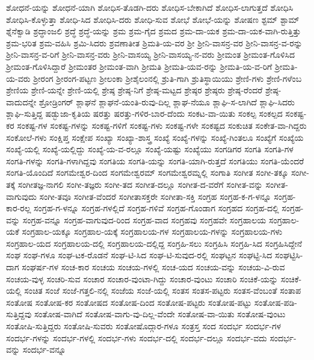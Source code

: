{ಶೋಧನೆ-ಯನ್ನು
ಶೋಧನೆ-ಯಾಗಿ
ಶೋಧಿಸ-ತೊಡಗಿ-ದರು
ಶೋಧಿಸ-ಬೇಕಾಗಿದೆ
ಶೋಧಿಸ-ಲಾಗುತ್ತದೆ
ಶೋಧಿಸಿ
ಶೋಧಿಸಿ-ಕೊಳ್ಳುತ್ತಾ
ಶೋಧಿ-ಸಿದ
ಶೋಧಿಸಿ-ದರು
ಶೋಧಿ-ಸುವ
ಶೋಭೆ
ಶೋಭೆ-ಯನ್ನು
ಶೋಷಣ
ಶ್ಟಮ್
ಶ್ಟಾಮ್
ಶ್ನೆನೆಕ್ವಾಡಿ
ಶ್ರದ್ಧಾಂಜಲಿ
ಶ್ರದ್ಧೆ
ಶ್ರದ್ಧೆ-ಯನ್ನು
ಶ್ರಮ
ಶ್ರಮ-ಗೈದ
ಶ್ರಮದ
ಶ್ರಮ-ದಾ-ಯಕ
ಶ್ರಮ-ದಾ-ಯಕ-ವಾಗಿ-ರುತ್ತಿತ್ತು
ಶ್ರಮ-ಭರಿತ
ಶ್ರಮ-ವಹಿಸಿ
ಶ್ರಮಿ-ಸಿದರು
ಶ್ರವಣಾತೀತ
ಶ್ರಿಮತಿ-ಯ-ವರ
ಶ್ರೀ
ಶ್ರೀನಿ-ವಾಸನ್ರ-ವರ
ಶ್ರೀನಿ-ವಾಸನ್ರ-ವ-ರನ್ನು
ಶ್ರೀನಿ-ವಾಸನ್ರ-ವ-ರಿಗೆ
ಶ್ರೀನಿ-ವಾಸನ್ರ-ವರು
ಶ್ರೀನಿ-ವಾಸಯ್ಯ
ಶ್ರೀನಿ-ವಾಸಯ್ಯ-ನ-ವರು
ಶ್ರೀಮಂತ
ಶ್ರೀಮಂತ-ಗೊಳಿಸಿದ
ಶ್ರೀಮಂತ-ಗೊಳಿಸಿದ್ದಾರೆ
ಶ್ರೀಮಂತರ
ಶ್ರೀಮಂತ-ವಾಗಿ
ಶ್ರೀಮತಿ
ಶ್ರೀಮತಿ-ಯವ-ರನ್ನು
ಶ್ರೀಮತಿ-ಯ-ವ-ರಿಗೆ
ಶ್ರೀಮತಿ-ಯ-ವರು
ಶ್ರೀರಂಗ
ಶ್ರೀರಂಗ-ಪಟ್ಟಣ
ಶ್ರೀಲಂಕಾ
ಶ್ರೀಶೈಲಂನಲ್ಲಿ
ಶ್ರುತಿ-ಗಾಗಿ
ಶ್ರುತಿಸ್ಥಾಯಿಯು
ಶ್ರೇಣಿ-ಗಳು
ಶ್ರೇಣಿ-ಗಳೆಂಬ
ಶ್ರೇಣಿಯ
ಶ್ರೇಣಿ-ಯನ್ನೇ
ಶ್ರೇಣಿ-ಯಲ್ಲಿ
ಶ್ರೇಷ್ಠ
ಶ್ರೇಷ್ಠ-ನಿಗೆ
ಶ್ರೇಷ್ಠ-ಮಟ್ಟದ
ಶ್ರೇಷ್ಠರ
ಶ್ರೇಷ್ಠರು
ಶ್ರೇಷ್ಠ-ರೆಂದರೆ
ಶ್ರೇಷ್ಠ-ವಾದುದನ್ನೇ
ಶ್ರೋಡ್ರಿಂಗರ್
ಶ್ಲಾಘನೆ
ಶ್ಲಾಘನೆ-ಯಂತಿ-ರುವು-ದಿಲ್ಲ
ಶ್ಲಾಘ-ನೆಯೂ
ಶ್ಲಾಘಿ-ಸ-ಲಾಗಿದೆ
ಶ್ಲಾಘಿ-ಸಿದರು
ಶ್ಲಾಘಿ-ಸುತ್ತಿದ್ದ
ಷಡ್ಭುಜಾ-ಕೃತಿಯ
ಷರತ್ತು
ಷರತ್ತು-ಗಳಿರ-ಬಾರ-ದೆಂದು
ಸಂಕಟ-ವಾ-ಯಿತು
ಸಂಕಲ್ಪ
ಸಂಕಲ್ಪದ
ಸಂಕಷ್ಟ-ಕರ
ಸಂಕಷ್ಟ-ಗಳ
ಸಂಕಷ್ಟ-ಗಳನ್ನು
ಸಂಕಷ್ಟ-ಗಳಿಗೆ
ಸಂಕಷ್ಟ-ಗಳು
ಸಂಕಷ್ಟ-ಗಳೇ
ಸಂಕಷ್ಟದ
ಸಂಕುಚಿತ
ಸಂಕೇತ-ವಾ-ಗಿದ್ದರು
ಸಂಕೋಲೆ-ಗಳು
ಸಂಕ್ಷಿಪ್ತ
ಸಂಕ್ಷೇಪ
ಸಂಖ್ಯಾ
ಸಂಖ್ಯಾ-ಶಾಸ್ತ್ರ
ಸಂಖ್ಯೆ
ಸಂಖ್ಯೆ-ಗಳನ್ನು
ಸಂಖ್ಯೆ-ಗಿಂತಲೂ
ಸಂಖ್ಯೆಗೆ
ಸಂಖ್ಯೆಯ
ಸಂಖ್ಯೆ-ಯಲ್ಲಿ
ಸಂಖ್ಯೆ-ಯಲ್ಲಿದ್ದು
ಸಂಖ್ಯೆ-ಯ-ವ-ರಲ್ಲೂ
ಸಂಖ್ಯೆ-ಯಷ್ಟು
ಸಂಖ್ಯೆಯು
ಸಂಗಡಿಗರ
ಸಂಗತಿ
ಸಂಗತಿ-ಗಳ
ಸಂಗತಿ-ಗಳನ್ನು
ಸಂಗತಿ-ಗಳಾಗಿದ್ದವು
ಸಂಗತಿಯ
ಸಂಗತಿ-ಯನ್ನು
ಸಂಗತಿ-ಯಾಗಿ-ರುತ್ತದೆ
ಸಂಗತಿಯು
ಸಂಗತಿ-ಯೆಂದರೆ
ಸಂಗತಿ-ಯೊಂದಿದೆ
ಸಂಗಮೇಶ್ವರ-ದಿಂದ
ಸಂಗಮೇಶ್ವರಮ್
ಸಂಗಮೇಶ್ವರಮ್ನಲ್ಲಿ
ಸಂಗಾತಿ
ಸಂಗೀತ
ಸಂಗೀ-ತಕ್ಕೂ
ಸಂಗೀ-ತಕ್ಕೆ
ಸಂಗೀತಜ್ಞ-ನಾಗಲಿ
ಸಂಗೀ-ತಜ್ಞರು
ಸಂಗೀ-ತದ
ಸಂಗೀತ-ದಲ್ಲೂ
ಸಂಗೀತ-ದ-ವರೆಗೆ
ಸಂಗೀತ-ವನ್ನು
ಸಂಗೀತ-ವಾಗುವುದು
ಸಂಗೀ-ತವೂ
ಸಂಗೀತ-ವೆಂದರೆ
ಸಂಗೀತಾಸಕ್ತರೇ
ಸಂಗೀತಾ-ಸಕ್ತಿ
ಸಂಗ್ರಹ
ಸಂಗ್ರಹ-ಕ-ಗ-ಳನ್ನೂ
ಸಂಗ್ರಹ-ಕಾರ-ರಲ್ಲ
ಸಂಗ್ರಹ-ಗ-ಳನ್ನೂ
ಸಂಗ್ರಹ-ಗಳಲ್ಲಿದೆ
ಸಂಗ್ರಹ-ಗಳಿವೆ
ಸಂಗ್ರಹ-ಗೊಂಡಾಗ
ಸಂಗ್ರಹದ
ಸಂಗ್ರಹ-ದಲ್ಲಿ
ಸಂಗ್ರಹ-ವನ್ನು
ಸಂಗ್ರಹ-ವನ್ನೂ
ಸಂಗ್ರಹ-ವಾಗುವುದ-ರಿಂದ
ಸಂಗ್ರಹ-ವಾದ
ಸಂಗ್ರಹವು
ಸಂಗ್ರಹವೇ
ಸಂಗ್ರಹಾಲಯ
ಸಂಗ್ರಹಾಲ-ಯಕೆ
ಸಂಗ್ರಹಾಲ-ಯಕ್ಕೂ
ಸಂಗ್ರಹಾಲ-ಯಕ್ಕೆ
ಸಂಗ್ರಹಾಲಯ-ಗಳ
ಸಂಗ್ರಹಾಲಯ-ಗಳನ್ನು
ಸಂಗ್ರಹಾಲಯ-ಗಳು
ಸಂಗ್ರಹಾಲ-ಯದ
ಸಂಗ್ರಹಾಲಯ-ದಲ್ಲಿ
ಸಂಗ್ರಹಾಲಯ-ದಲ್ಲಿದ್ದ
ಸಂಗ್ರಹಿ-ಸಲು
ಸಂಗ್ರಹಿಸಿ
ಸಂಗ್ರಹಿ-ಸಿದ
ಸಂಗ್ರಹಿಸಿದ್ದೇನೆ
ಸಂಘ
ಸಂಘ-ಗಳೂ
ಸಂಘ-ಟಕ-ರೊಡನೆ
ಸಂಘ-ಟಿ-ಸಿದ
ಸಂಘ-ಟಿ-ಸುವುದ-ರಲ್ಲಿ
ಸಂಘಟ್ಟನ
ಸಂಘಟ್ಟಿ-ಸಿದ
ಸಂಘಟ್ಟಿಸಿ-ದಾಗ
ಸಂಘರ್ಷ-ಗಳ
ಸಂಚ-ಕಾರ
ಸಂಚಯ
ಸಂಚಯ-ಗಳಲ್ಲಿ
ಸಂಚ-ಯದ
ಸಂಚಯ-ವನ್ನು
ಸಂಚಯ-ವಿ-ರುವ
ಸಂಚಯ-ವುಳ್ಳ
ಸಂಚರಿ-ಸುವ
ಸಂಚಾರ
ಸಂಚಾರ-ವುಂಟಾ-ಗಿದ್ದು
ಸಂಚಾರ-ವುಂಟು
ಸಂಚಾರಿ
ಸಂಚಿಕೆ-ಯನ್ನು
ಸಂಚಿಕೆ-ಯಲ್ಲಿ
ಸಂಚಿತ
ಸಂಜೆ
ಸಂಜೆ-ಗತ್ತಲಿ-ನಲ್ಲಿ
ಸಂಜೆಯ
ಸಂಜೆ-ಯಲ್ಲಿ
ಸಂತಸ
ಸಂತಸ-ಪಟ್ಟರು
ಸಂತಸ-ವೆಂಬಂತೆ
ಸಂತಾಪ
ಸಂತೋಷ
ಸಂತೋಷ-ಕರ
ಸಂತೋಷದ
ಸಂತೋಷ-ದಿಂದ
ಸಂತೋಷ-ಪಟ್ಟರು
ಸಂತೋಷ-ಪಟ್ಟು
ಸಂತೋಷ-ಪಡಿ-ಸುತ್ತಿದ್ದವು
ಸಂತೋಷ-ವಾಗಿದೆ
ಸಂತೋಷ-ವಾಗು-ವು-ದಿಲ್ಲ-ವೆಂದೇ
ಸಂತೋಷ-ವಾ-ಯಿತು
ಸಂತೋಷ-ವುಂಟು
ಸಂತೋಷಿ-ಸುತ್ತಿದ್ದರು
ಸಂತೋಷಿ-ಸುವರು
ಸಂತೋಷೊದ್ಗಾರ-ಗಳೂ
ಸಂತ್ರಸ್ತ
ಸಂದ
ಸಂದರ್ಭ
ಸಂದರ್ಭ-ಗಳ
ಸಂದರ್ಭ-ಗಳನ್ನು
ಸಂದರ್ಭ-ಗಳಲ್ಲಿ
ಸಂದರ್ಭ-ಗಳು
ಸಂದರ್ಭ-ದಲ್ಲಿ
ಸಂದರ್ಭ-ದಲ್ಲೂ
ಸಂದರ್ಭ-ವದು
ಸಂದರ್ಭ-ವನ್ನು
ಸಂದರ್ಭ-ವನ್ನೂ
}
